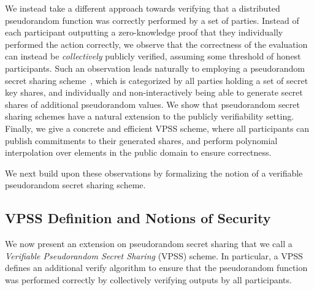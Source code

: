 We instead take a different approach towards verifying that a distributed pseudorandom function was correctly performed by a set of parties.
Instead of each participant outputting a zero-knowledge proof that they individually performed the action correctly,
we observe that the correctness of the evaluation can instead be \emph{collectively} publicly verified,
assuming some threshold of honest participants.
%
Such an observation leads naturally to employing a pseudorandom secret sharing scheme~\cite{CramerDI05},
which is categorized by all parties holding a set of secret key shares,
and individually and non-interactively being able to generate secret shares
of additional pseudorandom values.
We show that pseudorandom secret sharing schemes have a natural extension to the publicly verifiability setting.
Finally,
we give a concrete and efficient VPSS scheme,
where all participants can publish commitments to their generated shares,
and perform polynomial interpolation over elements in the public domain to ensure correctness.

We next build upon these observations by formalizing the notion of a verifiable pseudorandom secret sharing scheme.

\subsection{VPSS Definition and Notions of Security}

We now present an extension on pseudorandom secret sharing that we call a
\emph{Verifiable Pseudorandom Secret Sharing} (VPSS) scheme.
In particular,
a VPSS defines an additional verify algorithm to ensure that the pseudorandom function was performed correctly by collectively verifying outputs by all participants.


